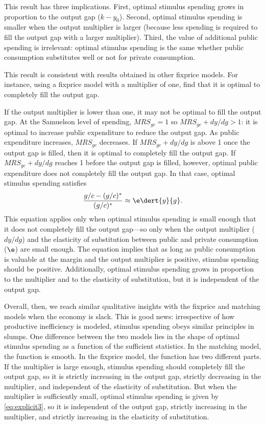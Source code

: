 \documentclass[letterpaper,12pt,leqno]{article}
\begin{document}
\begin{bibunit}
This result has three implications. First, optimal stimulus spending grows in proportion to the output gap ($k-y_0$). Second, optimal stimulus spending is smaller when the output multiplier is larger (because less spending is required to fill the output gap with a larger multiplier). Third, the value of additional public spending is irrelevant: optimal stimulus spending is the same whether public consumption substitutes well or not for private consumption.

This result is consistent with results obtained in other fixprice models. For instance, using a fixprice model with a multiplier of one,  find that it is optimal to completely fill the output gap.

If the output multiplier is lower than one, it may not be optimal to fill the output gap. At the Samuelson level of spending, $MRS_{gc}=1$ so $MRS_{gc}+dy/dg>1$: it is optimal to increase public expenditure to reduce the output gap. As public expenditure increases, $MRS_{gc}$ decreases. If $MRS_{gc}+dy/dg$ is above 1 once the output gap is filled, then it is optimal to completely fill the output gap. If $MRS_{gc}+dy/dg$ reaches 1 before the output gap is filled, however, optimal public expenditure does not completely fill the output gap. In that case, optimal stimulus spending satisfies
\begin{equation}
\frac{g/c-(g/c)^*}{(g/c)^*} \approx \e \dert{y}{g}.
\label{eq:explicit3}\end{equation} 
This equation applies only when optimal stimulus spending is small enough that it does not completely fill the output gap---so only when the output multiplier ($dy/dg$) and the elasticity of substitution between public and private consumption ($\e$) are small enough. The equation implies that as long as public consumption is valuable at the margin and the output multiplier is positive, stimulus spending should be positive. Additionally, optimal stimulus spending grows in proportion to the multiplier and to the elasticity of substitution, but it is independent of the output gap.

Overall, then, we reach similar qualitative insights with the fixprice and matching models when the economy is slack. This is good news: irrespective of how productive inefficiency is modeled, stimulus spending obeys similar principles in slumps. One difference between the two models lies in the shape of optimal stimulus spending as a function of the sufficient statistics. In the matching model, the function is smooth. In the fixprice model, the function has two different parts. If the multiplier is large enough, stimulus spending should completely fill the output gap, so it is strictly increasing in the output gap, strictly decreasing in the multiplier, and independent of the elasticity of substitution. But when the multiplier is sufficiently small, optimal stimulus spending is given by \eqref{eq:explicit3}, so it is independent of the output gap, strictly increasing in the multiplier, and strictly increasing in the elasticity of substitution.


\end{bibunit}
\end{document}
